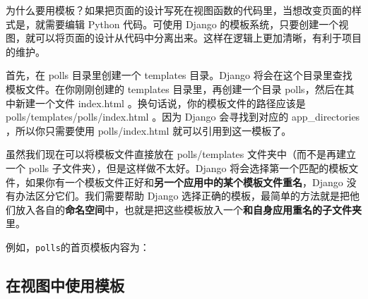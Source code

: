 \documentclass[]{ctexbook}
\newenvironment{Shaded}{\begin{snugshade}}{\end{snugshade}}
\newcommand{\ControlFlowTok}[1]{\textcolor[rgb]{0.13,0.29,0.53}{\textbf{#1}}}
\newcommand{\KeywordTok}[1]{\textcolor[rgb]{0.13,0.29,0.53}{\textbf{#1}}}
\newcommand{\NormalTok}[1]{#1}
\newcommand{\OperatorTok}[1]{\textcolor[rgb]{0.81,0.36,0.00}{\textbf{#1}}}
\newcommand{\SpecialCharTok}[1]{\textcolor[rgb]{0.00,0.00,0.00}{#1}}
\newcommand{\StringTok}[1]{\textcolor[rgb]{0.31,0.60,0.02}{#1}}
\begin{document}
为什么要用模板？如果把页面的设计写死在视图函数的代码里，当想改变页面的样式是，就需要编辑 Python 代码。可使用 Django 的模板系统，只要创建一个视图，就可以将页面的设计从代码中分离出来。这样在逻辑上更加清晰，有利于项目的维护。

首先，在 polls 目录里创建一个 templates 目录。Django 将会在这个目录里查找模板文件。在你刚刚创建的 templates 目录里，再创建一个目录 polls，然后在其中新建一个文件 index.html 。换句话说，你的模板文件的路径应该是 polls/templates/polls/index.html 。因为 Django 会寻找到对应的 app\_directories ，所以你只需要使用 polls/index.html 就可以引用到这一模板了。

虽然我们现在可以将模板文件直接放在 polls/templates 文件夹中（而不是再建立一个 polls 子文件夹），但是这样做不太好。Django 将会选择第一个匹配的模板文件，如果你有一个模板文件正好和\textbf{另一个应用中的某个模板文件重名}，Django 没有办法区分它们。我们需要帮助 Django 选择正确的模板，最简单的方法就是把他们放入各自的\textbf{命名空间}中，也就是把这些模板放入一个\textbf{和自身应用重名的子文件夹}里。

例如，\texttt{polls}的首页模板内容为：

\begin{Shaded}
\end{Shaded}

\hypertarget{ux5728ux89c6ux56feux4e2dux4f7fux7528ux6a21ux677f}{%
\subsection{在视图中使用模板}\label{ux5728ux89c6ux56feux4e2dux4f7fux7528ux6a21ux677f}}
\end{document}
